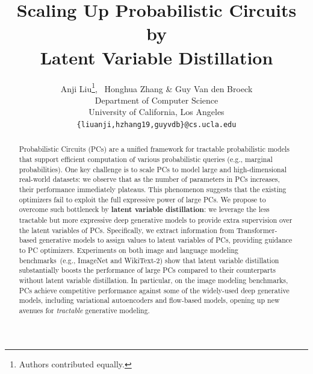 \documentclass{article} %
\title{Scaling Up Probabilistic Circuits by \\ Latent Variable Distillation}
\author{Anji Liu\thanks{Authors contributed equally.}, $\,$ Honghua Zhang\footnotemark[1] $\,\,$\& Guy Van den Broeck \\
Department of Computer Science\\
University of California, Los Angeles\\
\texttt{\{liuanji,hzhang19,guyvdb\}@cs.ucla.edu} \\
}
\begin{document}
\maketitle

\begin{abstract}
Probabilistic Circuits (PCs) are a unified framework for tractable probabilistic models that support efficient computation of various probabilistic queries (e.g., marginal probabilities). One key challenge is to scale PCs to model large and high-dimensional real-world datasets: we observe that as the number of parameters in PCs increases, their performance immediately plateaus. This phenomenon suggests that the existing optimizers fail to exploit the full expressive power of large PCs. We propose to overcome such bottleneck by \textbf{latent variable distillation}: we leverage the less tractable but more expressive deep generative models to provide extra supervision over the latent variables of PCs. Specifically, we extract information from Transformer-based generative models to assign values to latent variables of PCs, providing guidance to PC optimizers. Experiments on both image and language modeling benchmarks~(e.g., ImageNet and WikiText-2) show that latent variable distillation substantially boosts the performance of large PCs compared to their counterparts without latent variable distillation. In particular, on the image modeling benchmarks, PCs achieve competitive performance against some of the widely-used deep generative models, including variational autoencoders and flow-based models, opening up new avenues for {\it tractable} generative modeling.

\end{abstract}
\end{document}
